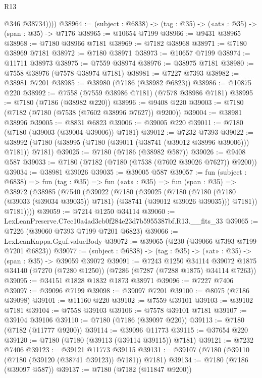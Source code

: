 \begin{lexlean}{R13}
\begin{coremodule}
            @346
            @38734))))
@38964 := (subject : @6838) -> (tag : @35) -> («at» : @35) -> (span : @35) -> @7176
@38965 := @10654 @7199
@38966 := @9431 @38965
@38968 := @7180 @38966 @7181
@38969 := @7182 @38968
@38971 := @7180 @38969 @7181
@38972 := @7180 @38971
@38973 := @10657 @7199
@38974 := @11711 @38973
@38975 := @7559 @38974
@38976 := @38975 @7181
@38980 := @7558 @38976 (@7578 @38974 @7181)
@38981 := @7227 @7393
@38982 := @38981 @7201
@38985 := @38980 (@7186 (@38982 @6823))
@38986 := @10875 @220
@38992 := @7558 (@7559 @38986 @7181) (@7578 @38986 @7181)
@38995 := @7180 (@7186 (@38982 @220))
@38996 := @9408 @220
@39003 := @7180 (@7182 (@7180 (@7538 (@7602 @38996 @7627)) @9200))
@39004 := @38981 @38996
@39005 := @8831 @6823
@39006 := @39005 @220
@39011 := @7180 (@7180 (@39003 (@39004 @39006)) @7181)
@39012 := @7232 @7393
@39022 := @38992 (@7180 (@38995 (@7180 (@39011 (@38741 (@39012 @38996 @39006))) @7181)) @7181)
@39025 := @7180 (@7186 (@38982 @587))
@39026 := @9408 @587
@39033 := @7180 (@7182 (@7180 (@7538 (@7602 @39026 @7627)) @9200))
@39034 := @38981 @39026
@39035 := @39005 @587
@39057 := fun (subject : @6838) =>
  fun (tag : @35) =>
  fun («at» : @35) =>
  fun (span : @35) =>
  @38972
    (@38985
      (@7540
        (@39022
          (@7180
            (@39025
              (@7180
                (@7180 (@7180 (@39033 (@39034 @39035)) @7181) (@38741 (@39012 @39026 @39035)))
                @7181))
            @7181))))
@39059 := @7214 @1250 @34114
@39060 := LexLeanPreserve.C7ec10a4ad3cb0f284e23d7b5955387bf.R13.__fits_33
@39065 := @7226 (@39060 @7393 @7199 @7201 @6823)
@39066 := LexLeanKappa.Gguf.valueBody
@39072 := @39065 (@230 (@39066 @7393 @7199 @7201 @6823))
@39077 := (subject : @6838) -> (tag : @35) -> («at» : @35) -> (span : @35) -> @39059 @39072
@39091 := @7243
    @1250
    @34114
    @39072
    @1875
    @34140
    (@7270 (@7280 @1250))
    (@7286 (@7287 (@7288 @1875) @34114 @7263))
@39095 := @34151 @1828 @1832 @1873 @38971
@39096 := @7227 @7406
@39097 := @39096 @7199
@39098 := @39097 @7201
@39100 := @8075 (@7186 @39098)
@39101 := @11160 @220
@39102 := @7559 @39101
@39103 := @39102 @7181
@39104 := @7558 @39103
@39106 := @7578 @39101 @7181
@39107 := @39104 @39106
@39110 := @7180 (@7186 (@39097 @220))
@39113 := @7180 (@7182 (@11777 @9200))
@39114 := @39096 @11773
@39115 := @37654 @220
@39120 := @7180 (@7180 (@39113 (@39114 @39115)) @7181)
@39121 := @7232 @7406
@39123 := @39121 @11773 @39115
@39131 := @39107 (@7180 (@39110 (@7180 (@39120 (@38741 @39123)) @7181)) @7181)
@39134 := @7180 (@7186 (@39097 @587))
@39137 := @7180 (@7182 (@11847 @9200))

\end{coremodule}
\end{lexlean}
